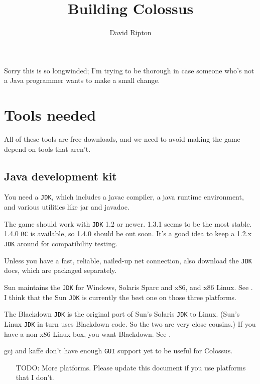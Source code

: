 \documentclass{article}
\begin{document}

\title{Building Colossus}

\author{David Ripton}

\maketitle

Sorry this is so longwinded; I'm trying to be thorough in case 
someone who's not a Java programmer wants to make a small change.

\section{Tools needed}

All of these tools are free downloads, and we need to avoid making 
the game depend on tools that aren't.

\subsection{Java development kit}

You need a \texttt{JDK}, which includes a javac compiler, a java runtime environment, 
and various utilities like jar and javadoc.

The game should work with \texttt{JDK} 1.2 or newer.  1.3.1 seems to be 
the most stable.  1.4.0 \texttt{RC} is available, so 1.4.0 should be out soon.
It's a good idea to keep a 1.2.x \texttt{JDK} around for compatibility testing.

Unless you have a fast, reliable, nailed-up net connection, also 
download the \texttt{JDK} docs, which are packaged separately.

Sun maintains the \texttt{JDK} for Windows, Solaris Sparc and x86, and x86 Linux.  
See . I think that the Sun \texttt{JDK} is currently
the best one on those three platforms.

The Blackdown \texttt{JDK} is the original port of Sun's Solaris \texttt{JDK} to Linux.  
(Sun's Linux \texttt{JDK} in turn uses Blackdown code.  So the two are very close
cousins.)  If you have a non-x86 Linux box, you want Blackdown.
See .

gcj and kaffe don't have enough \texttt{GUI} support yet to be useful for Colossus.

\begin{itemize}
\item[TODO:]  More platforms.  Please update this document if you use
platforms that I don't.
\end{itemize}
\end{document}
